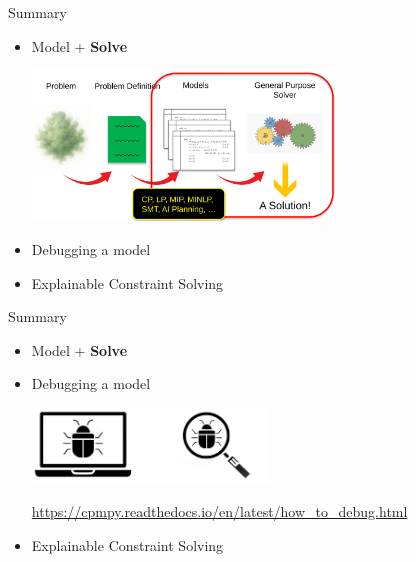 \documentclass{cons-beamer}
\begin{document}
\begin{frame}{Summary}
  \begin{itemize}
    \item Model + \textbf{Solve}
          \begin{center}
            \includegraphics[height=40mm]{images/prob2sol.png}
          \end{center}

    \item Debugging a model
          \vfill

    \item Explainable Constraint Solving
  \end{itemize}
\end{frame}

\begin{frame}{Summary}
  \begin{itemize}
    \item Model + \textbf{Solve}
          \vfill

    \item Debugging a model
          \begin{center}
            \includegraphics[height=20mm]{images/texpl_img/debug.jpg}
          \end{center}
          \url{https://cpmpy.readthedocs.io/en/latest/how_to_debug.html}
          \vfill

    \item Explainable Constraint Solving
  \end{itemize}
\end{frame}
\end{document}
